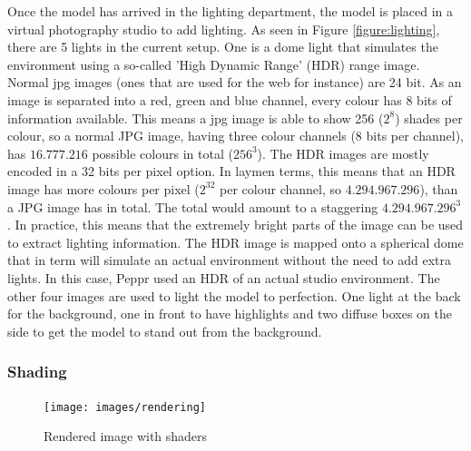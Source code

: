 Once the model has arrived in the lighting department, the model is placed in a virtual photography studio to add lighting. As seen in Figure \ref{figure:lighting}, there are 5 lights in the current setup. One is a dome light that simulates the environment using a so-called 'High Dynamic Range' (HDR) range image. Normal jpg images (ones that are used for the web for instance) are 24 bit. As an image is separated into a red, green and blue channel, every colour has 8 bits of information available. This means a jpg image is able to show 256 ($2^8$) shades per colour, so a normal JPG image, having three colour channels (8 bits per channel), has $16.777.216$ possible colours in total ($256^3$). \newline
The HDR images are mostly encoded in a 32 bits per pixel option. In laymen terms, this means that an HDR image has more colours per pixel ($2^{32}$ per colour channel, so $4.294.967.296$), than a JPG image has in total. The total would amount to a staggering $4.294.967.296 ^ 3$. In practice, this means that the extremely bright parts of the image can be used to extract lighting information. The HDR image is mapped onto a spherical dome that in term will simulate an actual environment without the need to add extra lights. In this case, Peppr used an HDR of an actual studio environment.
 The other four images are used to light the model to perfection. One light at the back for the background, one in front to have highlights and two diffuse boxes on the side to get the model to stand out from the background.


\subsubsection{Shading}

\begin{figure}
\vspace{-1cm}
\centering
\texttt{[image: images/rendering]}
\caption{Rendered image with shaders}
\label{figure:lighting_rendered}
\end{figure}

